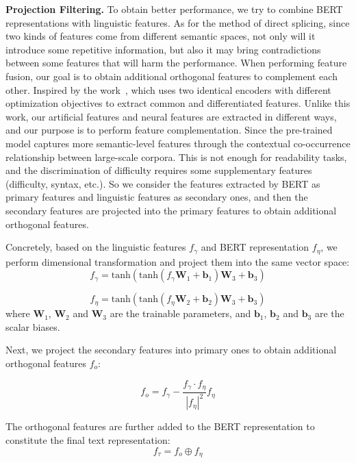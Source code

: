 \documentclass[11pt]{article}
\begin{document}
\noindent\textbf{Projection Filtering.} To obtain better performance, we try to combine BERT representations with linguistic features. As for the method of direct splicing, since two kinds of features come from different semantic spaces, not only will it introduce some repetitive information, 
but also it may bring contradictions between some features that will harm the performance. 
When performing feature fusion, our goal is to obtain additional orthogonal features to complement each other.
Inspired by the work~\cite{qin2020feature}, which uses two identical encoders with different optimization objectives to extract common and differentiated features.
Unlike this work, our artificial features and neural features are extracted in different ways, and our purpose is to perform feature complementation.
Since the pre-trained model captures more semantic-level features through the contextual co-occurrence relationship between large-scale corpora. This is not enough for readability tasks, and the discrimination of difficulty requires some supplementary features (difficulty, syntax, etc.).
So we consider the features extracted by BERT as primary features and linguistic features as secondary ones, and then the secondary features are projected into the primary features to obtain additional orthogonal features.

Concretely, based on the linguistic features $f_\gamma$ and BERT representation $f_\eta$, we perform dimensional transformation and project them into the same vector space:
\begin{equation}
f_{\gamma} = \text{tanh}(\text{tanh}(f_\gamma\mathbf W_1+ \mathbf b_1)\mathbf W_3+ \mathbf b_3)
\end{equation}

\begin{equation}
f_{\eta} = \text{tanh}(\text{tanh}(f_\eta\mathbf W_2+ \mathbf b_2)\mathbf W_3+ \mathbf b_3)
\end{equation}
where $\mathbf W_1$, $\mathbf W_2$ and $\mathbf W_3$ are the trainable parameters, and $\mathbf b_1$, $\mathbf b_2$ and $\mathbf b_3$ are the scalar biases. 

Next, we project the secondary features into primary ones to obtain additional orthogonal features $f_{o}$:

\begin{equation}
f_{o} = f_{\gamma} - \frac{f_{\gamma} \cdot f_{\eta}}{|f_{\eta}|^2}f_{\eta}
\end{equation}


The orthogonal features are further added to the BERT representation to constitute the final text representation:
\begin{equation}
f_{\tau} = f_{o} \oplus f_\eta
\end{equation}
\end{document}
